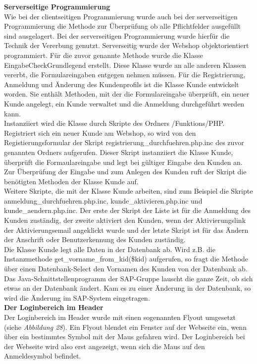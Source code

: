 \textbf{Serverseitige Programmierung}\\
Wie bei der clientseitigen Programmierung wurde auch bei der serverseitigen Programmierung die Methode zur Überprüfung ob alle Pflichtfelder ausgefüllt sind ausgelagert. Bei der serverseitigen Programmierung wurde hierfür die Technik der Vererbung genutzt. Serverseitig wurde der Webshop objektorientiert programmiert. Für die zuvor genannte Methode wurde die Klasse \glqq EingabeCheckGrundlegend\grqq{} erstellt. Diese Klasse wurde an alle anderen Klassen vererbt, die Formulareingaben entgegen nehmen müssen. Für die Registrierung, Anmeldung und Änderung des Kundenprofils ist die Klasse \glqq Kunde\grqq{} entwickelt worden. Sie enthält Methoden, mit der die Formulareingabe überprüft, ein neuer Kunde angelegt, ein Kunde verwaltet und die Anmeldung durchgeführt werden kann.\\
Instanziiert wird die Klasse durch Skripte des Ordners \glqq /Funktions/PHP\grqq{}. Registriert sich ein neuer Kunde am Webshop, so wird von den Registierungsformular der Skript \glqq registrierung\_durchfuehren.php.inc\grqq{} des zuvor genannten Ordners aufgerufen. Dieser Skript instanziiert die Klasse \glqq Kunde\grqq{}, überprüft die Formaulareingabe und legt bei gültiger Eingabe den Kunden an. Zur Überprüfung der Eingabe und zum Anlegen des Kunden ruft der Skript die benötigten Methoden der Klasse \glqq Kunde\grqq{} auf.\\
Weitere Skripte, die mit der Klasse \glqq Kunde\grqq{} arbeiten, sind zum Beispiel die Skripte \glqq anmeldung\_durchfuehren.php.inc\grqq{}, \glqq kunde\_aktivieren.php.inc\grqq{} und \glqq kunde\_aendern.php.inc\grqq{}. Der erste der Skript der Liste ist für die Anmeldung des Kunden zuständig, der zweite aktiviert den Kunden, wenn der Aktivierungslink der Aktivierungsemail angeklickt wurde und der letzte Skript ist für das Ändern der Anschrift oder Benutzerkennung des Kunden zuständig.\\
Die Klasse \glqq Kunde\grqq{} legt alle Daten in der Datenbank ab. Wird z.B. die Instanzmethode \glqq get\_vorname\_from\_kid(\$kid)\grqq{} aufgerufen, so fragt die Methode über einen Datenbank-Select den Vornamen des Kunden von der Datenbank ab. Das Java-Schnittstellenprogramm der SAP-Gruppe lauscht die ganze Zeit, ob sich etwas an der Datenbank ändert. Kam es zu einer Änderung in der Datenbank, so wird die Änderung im SAP-System eingetragen.\\

\textbf{Der Loginbereich im Header}\\
Der Loginbereich im Header wurde mit einen sogenannten \glqq Flyout\grqq{} umgesetzt (siehe \textit{Abbildung 28}). Ein Flyout blendet ein Fenster auf der Webseite ein, wenn über ein bestimmtes Symbol mit der Maus gefahren wird. Der Loginbereich bei der Webseite wird also erst angezeigt, wenn sich die Maus auf den Anmeldesymbol befindet. 

